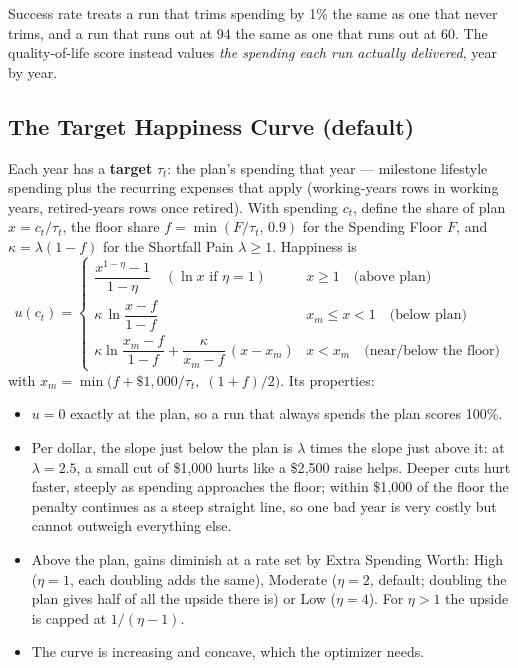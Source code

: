 \documentclass[11pt,letterpaper]{article}
\begin{document}
Success rate treats a run that trims spending by 1\% the same as one that never trims, and a run that runs out at 94 the same as one that runs out at 60. The quality-of-life score instead values \emph{the spending each run actually delivered}, year by year.

\subsection{The Target Happiness Curve (default)}
Each year has a \textbf{target} $\tau_t$: the plan's spending that year --- milestone lifestyle spending plus the recurring expenses that apply (working-years rows in working years, retired-years rows once retired). With spending $c_t$, define the share of plan $x = c_t/\tau_t$, the floor share $f = \min(F/\tau_t,\,0.9)$ for the Spending Floor $F$, and $\kappa = \lambda(1-f)$ for the Shortfall Pain $\lambda \ge 1$. Happiness is
\begin{equation}
u(c_t) = \begin{cases}
\dfrac{x^{1-\eta}-1}{1-\eta} \quad (\ln x \text{ if } \eta=1) & x \ge 1 \quad\text{(above plan)}\\[8pt]
\kappa\,\ln\!\dfrac{x-f}{1-f} & x_m \le x < 1 \quad\text{(below plan)}\\[8pt]
\kappa\ln\!\dfrac{x_m-f}{1-f} + \dfrac{\kappa}{x_m-f}\,(x-x_m) & x < x_m \quad\text{(near/below the floor)}
\end{cases}
\end{equation}
with $x_m = \min\!\big(f + \$1{,}000/\tau_t,\; (1+f)/2\big)$. Its properties:
\begin{itemize}
\setlength\itemsep{1pt}
\item $u = 0$ exactly at the plan, so a run that always spends the plan scores 100\%.
\item Per dollar, the slope just below the plan is $\lambda$ times the slope just above it: at $\lambda = 2.5$, a small cut of \$1{,}000 hurts like a \$2{,}500 raise helps. Deeper cuts hurt faster, steeply as spending approaches the floor; within \$1{,}000 of the floor the penalty continues as a steep straight line, so one bad year is very costly but cannot outweigh everything else.
\item Above the plan, gains diminish at a rate set by Extra Spending Worth: High ($\eta = 1$, each doubling adds the same), Moderate ($\eta=2$, default; doubling the plan gives half of all the upside there is) or Low ($\eta=4$). For $\eta>1$ the upside is capped at $1/(\eta-1)$.
\item The curve is increasing and concave, which the optimizer needs.
\end{itemize}
\end{document}

